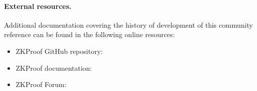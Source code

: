 \paragraph{External resources.}%
\label{par:prelim:change-log:external-resources}

Additional documentation covering the history of development of this 
community reference can be found in the following online resources:
\begin{itemize}[topsep=0pt,itemsep=1ex]
	\item ZKProof GitHub repository: 
	\item ZKProof documentation: \sloppy\mbox{}
	\item ZKProof Forum: 
\end{itemize}

